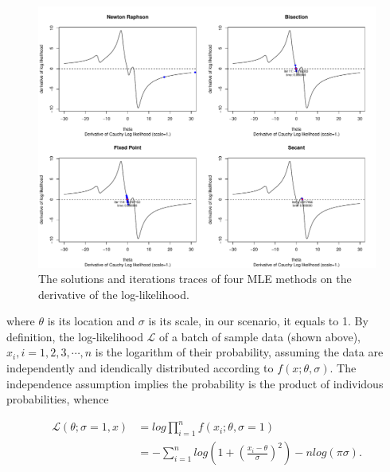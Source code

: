 \begin{figure}[h!]
\includegraphics[scale=0.3]{figs/cauchy-sol-on-deriv-4figs.pdf}
\caption{The solutions and iterations traces of four MLE methods on the derivative of the log-likelihood.}
\label{img:cauchy-sol-on-deriv-4figs}
\end{figure}

where $\theta$ is its location and $\sigma$ is its scale, in our scenario, it equals to 1. By definition, the log-likelihood $\mathcal L$ of a batch of sample data (shown above), $x_i, i=1,2,3,\cdots,n$ is the logarithm of their probability, assuming the data are independently and idendically distributed according to $f(x; \theta, \sigma)$. The independence assumption implies the probability is the product of individous probabilities, whence

\vspace{-0.1in}
\begin{equation*}
\begin{split}
\mathcal L (\theta; \sigma=1, x) 
&= log \prod^{n}_{i=1} f(x_i; \theta, \sigma=1) \\
& = - \sum^{n}_{i=1} log(1+(\frac{x_i-\theta}{\sigma})^{2}) - n log(\pi\sigma).
\end{split}
\end{equation*}

